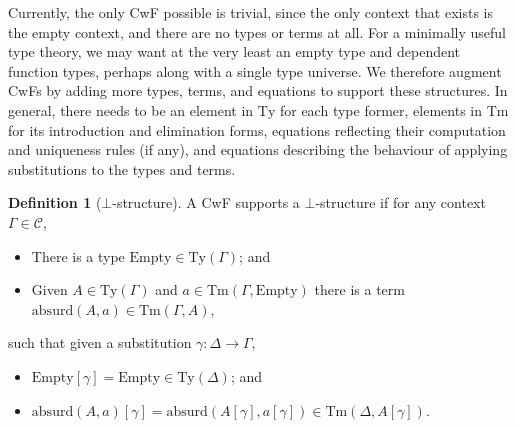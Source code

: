 \documentclass{article}
\renewcommand{\_}{\textrm{\textscale{.5}{\textunderscore}}}
\newcommand{\Tm}{\mathrm{Tm}}
\newcommand{\Ty}{\mathrm{Ty}}
\newcommand{\Empty}{\mathrm{Empty}}
\newcommand{\Absurd}{\mathrm{absurd}}
\theoremstyle{definition}
\newtheorem{definition}{Definition}[section]
\theoremstyle{plain}
\begin{document}
Currently, the only CwF possible is trivial,
since the only context that exists is the empty context,
and there are no types or terms at all.
For a minimally useful type theory, we may want at the very least an empty type and dependent function types,
perhaps along with a single type universe.
We therefore augment CwFs by adding more types, terms, and equations to support these structures.
In general, there needs to be an element in $\Ty$ for each type former,
elements in $\Tm$ for its introduction and elimination forms,
equations reflecting their computation and uniqueness rules (if any),
and equations describing the behaviour of applying substitutions to the types and terms.

\begin{definition}[$\bot$-structure]
A CwF supports a $\bot$-structure if for any context $\Gamma \in \mathcal{C}$,
\begin{itemize}
    \item There is a type $\Empty \in \Ty(\Gamma)$; and
    \item Given $A \in \Ty(\Gamma)$ and $a \in \Tm(\Gamma, \Empty)$
    there is a term $\Absurd(A, a) \in \Tm(\Gamma, A)$,
\end{itemize}
such that given a substitution $\gamma : \Delta \to \Gamma$,
\begin{itemize}
    \item $\Empty[\gamma] = \Empty \in \Ty(\Delta)$; and
    \item $\Absurd(A, a)[\gamma] = \Absurd(A[\gamma], a[\gamma]) \in \Tm(\Delta, A[\gamma])$.
\end{itemize}
\end{definition}
\end{document}

